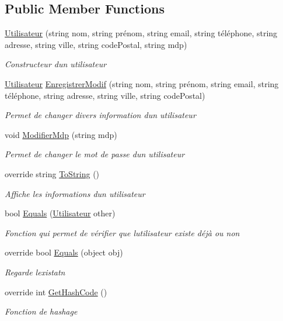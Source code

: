 \subsection*{Public Member Functions}
\begin{DoxyCompactItemize}
\item 
\hyperlink{classModele_1_1Utilisateur_a1d5c1f87797e60515771e6510c264436}{Utilisateur} (string nom, string prénom, string email, string téléphone, string adresse, string ville, string code\+Postal, string mdp)
\begin{DoxyCompactList}\small\item\em Constructeur d\textquotesingle{}un utilisateur \end{DoxyCompactList}\item 
\hyperlink{classModele_1_1Utilisateur}{Utilisateur} \hyperlink{classModele_1_1Utilisateur_a519e48833feeb7dd4b7dace0a32dab30}{Enregistrer\+Modif} (string nom, string prénom, string email, string téléphone, string adresse, string ville, string code\+Postal)
\begin{DoxyCompactList}\small\item\em Permet de changer divers information d\textquotesingle{}un utilisateur \end{DoxyCompactList}\item 
void \hyperlink{classModele_1_1Utilisateur_aa02aa408f6b952e01d356e3f66b543bd}{Modifier\+Mdp} (string mdp)
\begin{DoxyCompactList}\small\item\em Permet de changer le mot de passe d\textquotesingle{}un utilisateur \end{DoxyCompactList}\item 
override string \hyperlink{classModele_1_1Utilisateur_a268b6910465dc0d12768330b2067d12f}{To\+String} ()
\begin{DoxyCompactList}\small\item\em Affiche les informations d\textquotesingle{}un utilisateur \end{DoxyCompactList}\item 
bool \hyperlink{classModele_1_1Utilisateur_a9e1dffc7b478d59609cd06ad0bd58007}{Equals} (\hyperlink{classModele_1_1Utilisateur}{Utilisateur} other)
\begin{DoxyCompactList}\small\item\em Fonction qui permet de vérifier que l\textquotesingle{}utilisateur existe déjà ou non \end{DoxyCompactList}\item 
override bool \hyperlink{classModele_1_1Utilisateur_a65df3c13ece48ba76a4a7e473d5e21ce}{Equals} (object obj)
\begin{DoxyCompactList}\small\item\em Regarde l\textquotesingle{}existatn \end{DoxyCompactList}\item 
override int \hyperlink{classModele_1_1Utilisateur_ae84ea80af70b350ccc13e4210f400950}{Get\+Hash\+Code} ()
\begin{DoxyCompactList}\small\item\em Fonction de hashage \end{DoxyCompactList}\end{DoxyCompactItemize}
